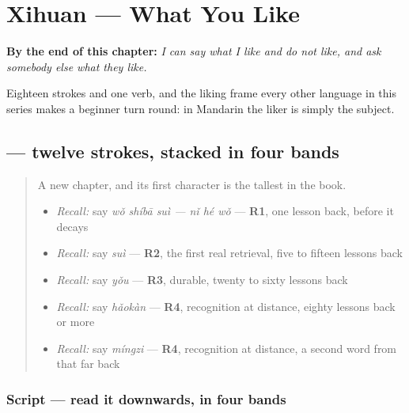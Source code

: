
\chapter{Xihuan — What You Like}
\label{ch:zh-xihuan}

\begin{chapteropening}
\textbf{By the end of this chapter:} \emph{I can say what I like and do not like, and ask somebody else what they like.}

Eighteen strokes and one verb, and the liking frame every other language in this series makes a beginner turn round: in Mandarin the liker is simply the subject.
\end{chapteropening}

\section[\texorpdfstring{\zh{喜} (xǐ)}{喜 (xǐ)}]{ — twelve strokes, stacked in four bands}

\label{lesson:ZH-W28-xi}



\begin{quote}
A new chapter, and its first character is the tallest in the book.

\begin{itemize}
\raggedright
  \item \emph{Recall:} say \emph{wǒ shíbā suì — nǐ hé wǒ} — \textbf{R1}, one lesson back, before it decays
  \item \emph{Recall:} say \emph{suì} — \textbf{R2}, the first real retrieval, five to fifteen lessons back
  \item \emph{Recall:} say \emph{yǒu} — \textbf{R3}, durable, twenty to sixty lessons back
  \item \emph{Recall:} say \emph{hǎokàn} — \textbf{R4}, recognition at distance, eighty lessons back or more
  \item \emph{Recall:} say \emph{míngzi} — \textbf{R4}, recognition at distance, a second word from that far back
\end{itemize}
\end{quote}

\subsection*{Script — read it downwards, in four bands}

